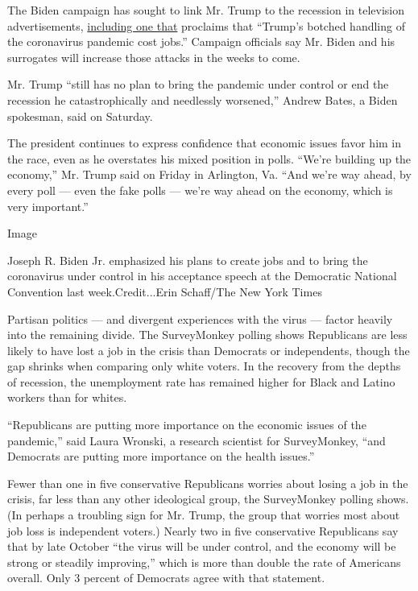 The Biden campaign has sought to link Mr. Trump to the recession in
television advertisements,
\href{https://www.youtube.com/watch?v=GSqZUfaxhvA}{including one that}
proclaims that ``Trump's botched handling of the coronavirus pandemic
cost jobs.'' Campaign officials say Mr. Biden and his surrogates will
increase those attacks in the weeks to come.

Mr. Trump ``still has no plan to bring the pandemic under control or end
the recession he catastrophically and needlessly worsened,'' Andrew
Bates, a Biden spokesman, said on Saturday.

The president continues to express confidence that economic issues favor
him in the race, even as he overstates his mixed position in polls.
``We're building up the economy,'' Mr. Trump said on Friday in
Arlington, Va. ``And we're way ahead, by every poll --- even the fake
polls --- we're way ahead on the economy, which is very important.''

Image

Joseph R. Biden Jr. emphasized his plans to create jobs and to bring the
coronavirus under control in his acceptance speech at the Democratic
National Convention last week.Credit...Erin Schaff/The New York Times

Partisan politics --- and divergent experiences with the virus ---
factor heavily into the remaining divide. The SurveyMonkey polling shows
Republicans are less likely to have lost a job in the crisis than
Democrats or independents, though the gap shrinks when comparing only
white voters. In the recovery from the depths of recession, the
unemployment rate has remained higher for Black and Latino workers than
for whites.

``Republicans are putting more importance on the economic issues of the
pandemic,'' said Laura Wronski, a research scientist for SurveyMonkey,
``and Democrats are putting more importance on the health issues.''

Fewer than one in five conservative Republicans worries about losing a
job in the crisis, far less than any other ideological group, the
SurveyMonkey polling shows. (In perhaps a troubling sign for Mr. Trump,
the group that worries most about job loss is independent voters.)
Nearly two in five conservative Republicans say that by late October
``the virus will be under control, and the economy will be strong or
steadily improving,'' which is more than double the rate of Americans
overall. Only 3 percent of Democrats agree with that statement.

